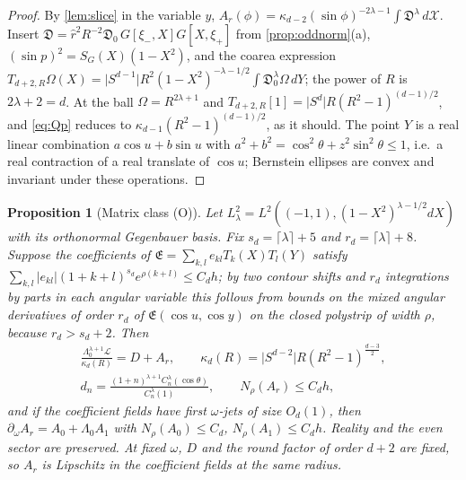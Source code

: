 \documentclass[11pt]{amsart}
\numberwithin{equation}{section}
\newtheorem{proposition}[theorem]{Proposition}
\theoremstyle{definition}
\theoremstyle{remark}
\newcommand{\abs}[1]{\lvert #1\rvert}
\newcommand{\Disc}{\mathfrak D}
\begin{document}
\begin{proof}
By \cref{lem:slice} in the variable $y$, $A_r(\phi)=\kappa_{d-2}(\sin\phi)^{-2\lambda-1}\int\Disc^\lambda\,d\mathcal X$. Insert $\Disc=\hat r^2R^{-2}\Disc_0\,G[\xi_-,X]G[X,\xi_+]$ from \cref{prop:oddnorm}(a), $(\sin p)^{2}=S_G(X)(1-X^2)$, and the coarea expression $T_{d+2,R}\Omega(X)=\abs{S^{d-1}}R^2(1-X^2)^{-\lambda-1/2}\int\Disc_0^\lambda\Omega\,dY$; the power of $R$ is $2\lambda+2=d$. At the ball $\Omega=R^{2\lambda+1}$ and $T_{d+2,R}[1]=\abs{S^d}R(R^2-1)^{(d-1)/2}$, and \eqref{eq:Qp} reduces to $\kappa_{d-1}(R^2-1)^{(d-1)/2}$, as it should. The point $Y$ is a real linear combination $a\cos u+b\sin u$ with $a^2+b^2=\cos^2\theta+z^2\sin^2\theta\le1$, i.e.\ a real contraction of a real translate of $\cos u$; Bernstein ellipses are convex and invariant under these operations.
\end{proof}

\begin{proposition}[Matrix class (O)]\label{prop:Oclass}
Let $L^2_\lambda=L^2((-1,1),(1-X^2)^{\lambda-1/2}dX)$ with its orthonormal Gegenbauer basis. Fix $s_d=\lceil\lambda\rceil+5$ and $r_d=\lceil\lambda\rceil+8$. Suppose the coefficients of $\mathfrak E=\sum_{k,l}e_{kl}T_k(X)T_l(Y)$ satisfy $\sum_{k,l}\abs{e_{kl}}(1+k+l)^{s_d}e^{\rho(k+l)}\le C_dh$; by two contour shifts and $r_d$ integrations by parts in each angular variable this follows from bounds on the mixed angular derivatives of order $r_d$ of $\mathfrak E(\cos u,\cos y)$ on the closed polystrip of width $\rho$, because $r_d>s_d+2$. Then
\begin{equation}\label{eq:matrixO}
\begin{gathered}
\frac{\Lambda_0^{\lambda+1}\mathcal L}{\kappa_d(R)}=D+A_r,\qquad \kappa_d(R)=\abs{S^{d-2}}R(R^2-1)^{\frac{d-3}2},\\
d_n=\frac{(1+n)^{\lambda+1}C_n^\lambda(\cos\theta)}{C_n^\lambda(1)},\qquad N_\rho(A_r)\le C_dh,
\end{gathered}
\end{equation}
and if the coefficient fields have first $\omega$-jets of size $O_d(1)$, then $\partial_\omega A_r=A_0+\Lambda_0A_1$ with $N_\rho(A_0)\le C_d$, $N_\rho(A_1)\le C_dh$. Reality and the even sector are preserved. At fixed $\omega$, $D$ and the round factor of order $d+2$ are fixed, so $A_r$ is Lipschitz in the coefficient fields at the same radius.
\end{proposition}
\end{document}
